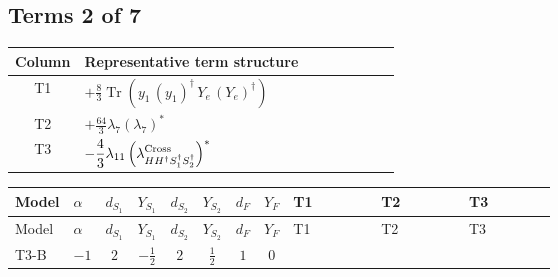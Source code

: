 \documentclass[8pt]{article}
\begin{document}
\begin{landscape}
\subsection*{Terms 2 of 7}
\begin{center}
\begin{tabular}{@{}c >{\raggedright\arraybackslash}p{0.82\linewidth}@{}}
\toprule
Column & Representative term structure \\
\midrule
T1 & \(\displaystyle +\frac{8}{3} \operatorname{Tr}\!\left({y_1}\,\left({y_1}\right)^{\dagger}\,{Y_e}\,\left({Y_e}\right)^{\dagger}\right)\) \\
\midrule
T2 & \(\displaystyle +\frac{64}{3} {\lambda_{7}} \left({\lambda_{7}}\right)^{*}\) \\
\midrule
T3 & \(\displaystyle -\frac{4}{3} {\lambda_{11}} \left({\lambda_{H H^\dagger S_1^\dagger S_2^\dagger}^{\rm Cross}}\right)^{*}\) \\
\midrule
\bottomrule
\end{tabular}
\end{center}
\smallskip
\tiny
\begin{longtable}{@{}llcccccc >{\raggedright\arraybackslash}p{0.21\linewidth} >{\raggedright\arraybackslash}p{0.21\linewidth} >{\raggedright\arraybackslash}p{0.21\linewidth}@{}}
\toprule
Model & $\alpha$ & $d_{S_1}$ & $Y_{S_1}$ & $d_{S_2}$ & $Y_{S_2}$ & $d_F$ & $Y_F$ & T1 & T2 & T3 \\
\midrule
\endfirsthead
\toprule
Model & $\alpha$ & $d_{S_1}$ & $Y_{S_1}$ & $d_{S_2}$ & $Y_{S_2}$ & $d_F$ & $Y_F$ & T1 & T2 & T3 \\
\midrule
\endhead
T3-B & $-1$ & $2$ & $-\frac{1}{2}$ & $2$ & $\frac{1}{2}$ & $1$ & $0$ & \scriptsize\adjustbox{max width=\linewidth}{$\begin{gathered} +\frac{8}{3} \operatorname{Tr}\!\left({y_1}\,\left({y_1}\right)^{\dagger}\,{Y_e}\,\left({Y_e}\right)^{\dagger}\right)\end{gathered}$} & \scriptsize\adjustbox{max width=\linewidth}{$\begin{gathered} +\frac{64}{3} {\lambda_{7}} \left({\lambda_{7}}\right)^{*}\end{gathered}$} & \scriptsize\adjustbox{max width=\linewidth}{$\begin{gathered} -\frac{4}{3} {\lambda_{11}} \left({\lambda_{H H^\dagger S_1^\dagger S_2^\dagger}^{\rm Cross}}\right)^{*}\end{gathered}$} \\
\midrule

\end{longtable}
\end{landscape}
\end{document}
